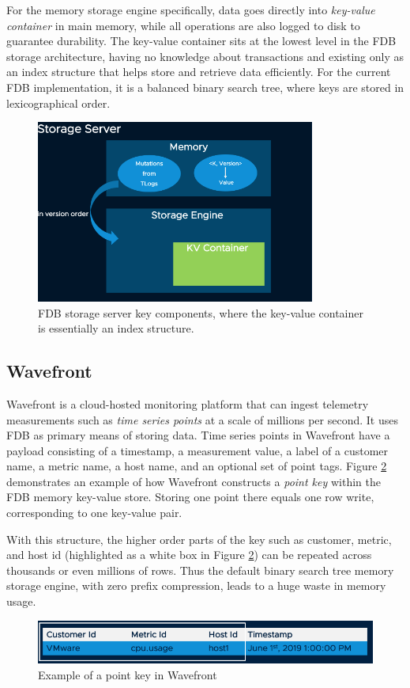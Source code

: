 \documentclass[sigplan,screen,nonacm]{acmart}
\begin{document}
For the memory storage engine specifically, data goes directly into {\itshape key-value container} in main memory, while all operations are also logged to disk to guarantee durability.  The key-value container sits at the lowest level in the FDB storage architecture, having no knowledge about transactions and existing only as an index structure that helps store and retrieve data efficiently. For the  current FDB implementation, it is a balanced binary search tree, where keys are stored in lexicographical order. 
\begin{figure}[t]
  \centering
  \includegraphics[width=\linewidth, height=6cm]{pic/FDB-storage-architecture.png}
  \setlength{\abovecaptionskip}{-10pt} 
  \setlength{\belowcaptionskip}{-7pt} 
  \caption{FDB storage server key components, where the key-value container is essentially an index structure.}
  \label{fig:FDB-storage-architecture}
\end{figure}

\subsection{Wavefront}
Wavefront \cite{wavefront} is a cloud-hosted monitoring platform that can ingest telemetry measurements such as {\itshape time series points} at a scale of millions per second. It uses FDB as primary means of storing data. Time series points in Wavefront have a payload consisting of a timestamp, a measurement value, a label of a customer name, a metric name, a host name, and an optional set of point tags. Figure \ref{fig:point-key} demonstrates an example of how Wavefront constructs a {\itshape point key} within the FDB memory key-value store. Storing one point there equals one row write, corresponding to one key-value pair.  

With this structure, the higher order parts of the key such as customer, metric, and host id (highlighted as a white box in Figure \ref{fig:point-key}) can be repeated across thousands or even millions of rows.  Thus the default binary search tree memory storage engine, with zero prefix compression, leads to a huge waste in memory usage. 
\begin{figure}[h]
  \centering
  \includegraphics[width=\linewidth]{pic/point key.png}
  \setlength{\abovecaptionskip}{-10pt} 
  \setlength{\belowcaptionskip}{-7pt} 
  \caption{Example of a point key in Wavefront}
  \label{fig:point-key}
\end{figure}
\end{document}
